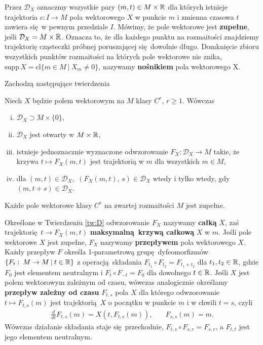 Przez \(\mathcal{D}_X\) oznaczmy wszystkie pary \((m, t)\in M \times \mathbb{R}\) dla których istnieje trajektoria \(c: I\rightarrow M\) pola wektorowego \(X\) w punkcie \(m\) i zmienna czasowa \(t\) zawiera się w pewnym przedziale \(I\). Mówimy, że pole wektorowe jest \textbf{zupełne}, jeśli \(\mathcal{D}_X = M \times \mathbb{R}\). Oznacza to, że dla każdego punktu na rozmaitości znajdziemy trajektorię cząsteczki próbnej poruszającej się dowolnie długo. Domknięcie zbioru wszystkich punktów rozmaitości na których pole wektorowe nie znika, \(\mathrm{supp}\,X=\mathrm{cl}\{m\in M\:|\: X_m\neq 0\}\), nazywamy \textbf{nośnikiem} pola wektorowego X.

Zachodzą następujące twierdzenia
\begin{twierdzenie}\label{tw:D}
Niech \(X\) będzie polem wektorowym na \(M\) klasy \(C^r,\, r\geq1\). Wówczas
\begin{enumerate}[i)]
\item \(\mathcal{D}_X\supset M\times \{0\}\),
\item \(\mathcal{D}_X\) jest otwarty w \(M\times \mathbb{R}\),
\item istnieje jednoznacznie wyznaczone odwzorowanie \(F_X:\mathcal{D}_X\rightarrow M\) takie, że krzywa \(t\mapsto F_X(m,t)\) jest trajektorią w \(m\) dla wszystkich \(m\in M\),
\item dla \((m,t)\in \mathcal{D}_X,\) \((F_X(m,t),\, s)\in\mathcal{D}_X\) wtedy i tylko wtedy, gdy \((m, t+s)\in \mathcal{D}_X\).
\end{enumerate}
\end{twierdzenie}

\begin{twierdzenie}
Każde pole wektorowe klasy \(C^r\) na zwartej rozmaitości \(M\) jest zupełne.
\end{twierdzenie}

Określone w Twierdzeniu \ref{tw:D} odwzorowanie \(F_X\) nazywamy \textbf{całką} \(X\), zaś trajektorię \(t\rightarrow F_X(m,t)\) \textbf{maksymalną krzywą całkową} \(X\) w \(m\). Jeśli pole wektorowe \(X\) jest zupełne, \(F_X\) nazywamy \textbf{przepływem} pola wektorowego \(X\). Każdy przepływ \(F\) określa 1-parametrową grupę dyfeomorfizmów \(\{F_t:\:M\rightarrow M\:|\: t\in \mathbb{R}\}\) z operacją składania \(F_{t_1}\circ F_{t_2} = F_{t_1 + t_2}\) dla \(t_{1}, {t}_2 \in \mathbb{R}\), gdzie \(F_0\) jest elementem neutralnym i \(F_{t}\circ F_{-t} = F_{0}\) dla dowolnego \(t\in\mathbb{R}\). Jeśli \(X\) jest polem wektorowym zależnym od czasu, wówczas analogicznie określamy \textbf{przepływ zależny od czasu} \(F_{t,s}\) pola \(X\) dla którego odwzorowanie \(t\mapsto F_{t,s}(m)\) jest trajektorią \(X\) o początku w punkcie \(m\) i w chwili \(t=s\), czyli
\begin{align}
\frac{d}{dt}F_{t,s}(m) = X\left(t, F_{t,s}(m)\right), &\quad F_{s,s}(m) = m.
\end{align}
Wówczas działanie składania staje się przechodnie, \(F_{t,s}\circ F_{s,r} = F_{s, r}\), a \(F_{t, t}\) jest jego elementem neutralnym.

